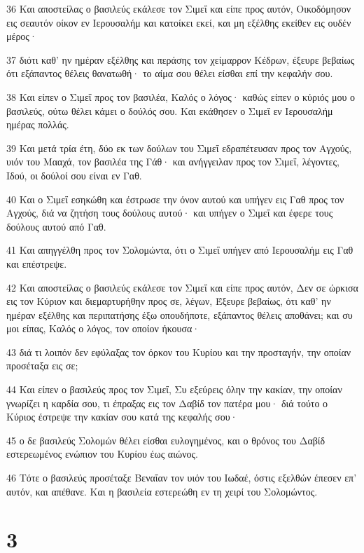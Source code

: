 \par 36 Και αποστείλας ο βασιλεύς εκάλεσε τον Σιμεΐ και είπε προς αυτόν, Οικοδόμησον εις σεαυτόν οίκον εν Ιερουσαλήμ και κατοίκει εκεί, και μη εξέλθης εκείθεν εις ουδέν μέρος·
\par 37 διότι καθ' ην ημέραν εξέλθης και περάσης τον χείμαρρον Κέδρων, έξευρε βεβαίως ότι εξάπαντος θέλεις θανατωθή· το αίμα σου θέλει είσθαι επί την κεφαλήν σου.
\par 38 Και είπεν ο Σιμεΐ προς τον βασιλέα, Καλός ο λόγος· καθώς είπεν ο κύριός μου ο βασιλεύς, ούτω θέλει κάμει ο δούλός σου. Και εκάθησεν ο Σιμεΐ εν Ιερουσαλήμ ημέρας πολλάς.
\par 39 Και μετά τρία έτη, δύο εκ των δούλων του Σιμεΐ εδραπέτευσαν προς τον Αγχούς, υιόν του Μααχά, τον βασιλέα της Γάθ· και ανήγγειλαν προς τον Σιμεΐ, λέγοντες, Ιδού, οι δούλοί σου είναι εν Γαθ.
\par 40 Και ο Σιμεΐ εσηκώθη και έστρωσε την όνον αυτού και υπήγεν εις Γαθ προς τον Αγχούς, διά να ζητήση τους δούλους αυτού· και υπήγεν ο Σιμεΐ και έφερε τους δούλους αυτού από Γαθ.
\par 41 Και απηγγέλθη προς τον Σολομώντα, ότι ο Σιμεΐ υπήγεν από Ιερουσαλήμ εις Γαθ και επέστρεψε.
\par 42 Και αποστείλας ο βασιλεύς εκάλεσε τον Σιμεΐ και είπε προς αυτόν, Δεν σε ώρκισα εις τον Κύριον και διεμαρτυρήθην προς σε, λέγων, Έξευρε βεβαίως, ότι καθ' ην ημέραν εξέλθης και περιπατήσης έξω οπουδήποτε, εξάπαντος θέλεις αποθάνει; και συ μοι είπας, Καλός ο λόγος, τον οποίον ήκουσα·
\par 43 διά τι λοιπόν δεν εφύλαξας τον όρκον του Κυρίου και την προσταγήν, την οποίαν προσέταξα εις σε;
\par 44 Και είπεν ο βασιλεύς προς τον Σιμεΐ, Συ εξεύρεις όλην την κακίαν, την οποίαν γνωρίζει η καρδία σου, τι έπραξας εις τον Δαβίδ τον πατέρα μου· διά τούτο ο Κύριος έστρεψε την κακίαν σου κατά της κεφαλής σου·
\par 45 ο δε βασιλεύς Σολομών θέλει είσθαι ευλογημένος, και ο θρόνος του Δαβίδ εστερεωμένος ενώπιον του Κυρίου έως αιώνος.
\par 46 Τότε ο βασιλεύς προσέταξε Βεναΐαν τον υιόν του Ιωδαέ, όστις εξελθών έπεσεν επ' αυτόν, και απέθανε. Και η βασιλεία εστερεώθη εν τη χειρί του Σολομώντος.

\chapter{3}

